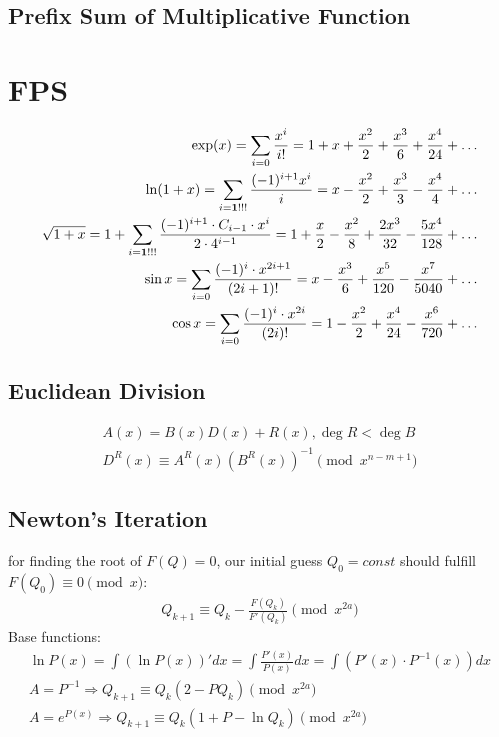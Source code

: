 \documentclass[10pt]{article}
\begin{document}
{\subsection{Prefix Sum of Multiplicative Function}

\section{FPS}
\begin{eqnarray*}
    \exp(x) = \sum_{i=0} \frac{x^i}{i!} = 1 + x + \frac{x^2}{2} + \frac{x^3}{6} + \frac{x^4}{24} + \ldots \\
    \ln(1 + x) = \sum_{i = \bold{1!!!}} \frac{(-1)^{i + 1} x^i}{i} = x - \frac{x^2}{2} + \frac{x^3}{3} - \frac{x^4}{4} + \ldots \\
    \sqrt{1 + x} = 1 + \sum_{i = \bold{1!!!}} \frac{(-1)^{i + 1} \cdot C_{i - 1} \cdot x^i}{2 \cdot 4^{i - 1}} = 1 + \frac{x}{2} - \frac{x^2}{8} + \frac{2x^3}{32} - \frac{5x^4}{128} + \ldots \\
    \sin{x} = \sum_{i = 0} \frac{(-1)^{i} \cdot x^{2i + 1}}{(2i + 1)!} = x - \frac{x^3}{6} + \frac{x^5}{120} - \frac{x^7}{5040} + \ldots \\
    \cos{x} = \sum_{i = 0} \frac{(-1)^{i} \cdot x^{2i}}{(2i)!} = 1 - \frac{x^2}{2} + \frac{x^4}{24} - \frac{x^6}{720} + \ldots
\end{eqnarray*}

\subsection{Euclidean Division}
\begin{eqnarray*}
    A(x) = B(x) D(x) + R(x), \deg R < \deg B \\
    D^R(x) \equiv A^R(x) (B^R(x))^{-1} \pmod {x^{n-m+1}}
\end{eqnarray*}


\subsection{Newton's Iteration} for finding the root of $F(Q) = 0$, our initial guess $Q_0 = const$ should fulfill $F(Q_0) \equiv 0 \pmod x$:
\begin{eqnarray*}
    Q_{k + 1} \equiv Q_k - \frac{F(Q_k)}{F'(Q_k)} \pmod {x^{2a}}
\end{eqnarray*}
Base functions:
\begin{eqnarray*}
    \ln P(x) = \int (\ln P(x))' dx = \int \frac{P'(x)}{P(x)} dx = \int (P'(x) \cdot P^{-1}(x)) dx \\
    A = P^{-1} \Rightarrow Q_{k + 1} \equiv Q_k(2 - PQ_{k}) \pmod {x^{2a}} \\
    A = e^{P(x)} \Rightarrow Q_{k + 1} \equiv Q_k(1 + P - \ln{Q_k}) \pmod {x^{2a}}
\end{eqnarray*}

}
\end{document}
